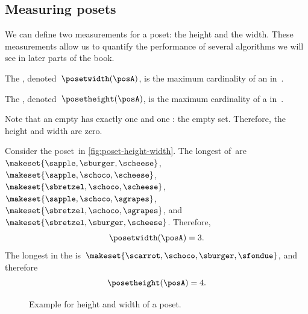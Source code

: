 \subsection{Measuring posets}
We can define two measurements for a poset: the height and the width.
These measurements allow us to quantify the performance of several algorithms we will see in later parts of the book.
\begin{definition}
    \label{def:poset-width}
    The , denoted~$\posetwidth(\posA)$, is the maximum cardinality of an  in~\posA.
\end{definition}

\begin{definition}
    \label{def:poset-height}
    The , denoted~$\posetheight(\posA)$, is the maximum cardinality of a  in~\posA.
\end{definition}

Note that an empty  has exactly one  and one : the empty set.
Therefore, the height and width are zero.

\begin{example}
    Consider the poset~\posA in \cref{fig:poset-height-width}.
    The longest  of~\posA are~$\makeset{\sapple, \sburger, \scheese}$, $\makeset{\sapple, \schoco, \scheese}$, $\makeset{\sbretzel, \schoco, \scheese}$, $\makeset{\sapple, \schoco, \sgrapes}$, $\makeset{\sbretzel, \schoco, \sgrapes}$, and~$\makeset{\sbretzel, \sburger, \scheese}$.
    Therefore,
    \begin{equation}\label{eq:poset-height-width-1}
        \posetwidth(\posA)=3.
    \end{equation}
    The longest  in the  is~$\makeset{\scarrot,\schoco,\sburger,\sfondue}$, and therefore
    \begin{equation}\label{eq:poset-height-width-2}
        \posetheight(\posA)=4.
    \end{equation}
\end{example}

\begin{figure}[h]
    \caption{Example for height and width of a poset.
    }
\end{figure}

